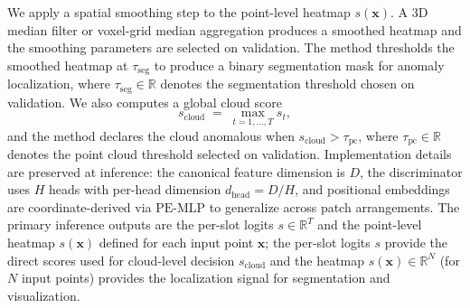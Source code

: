 We apply a spatial smoothing step to the point-level heatmap \(s(\mathbf{x})\). A 3D median filter or voxel-grid median aggregation produces a smoothed heatmap and the smoothing parameters are selected on validation. The method thresholds the smoothed heatmap at \(\tau_{\mathrm{seg}}\) to produce a binary segmentation mask for anomaly localization, where \(\tau_{\mathrm{seg}}\in\mathbb{R}\) denotes the segmentation threshold chosen on validation. We also computes a global cloud score
\begin{equation}
s_{\mathrm{cloud}} \;=\; \max_{t=1,\dots,T} s_t,
\end{equation}
and the method declares the cloud anomalous when \(s_{\mathrm{cloud}}>\tau_{\mathrm{pc}}\), where \(\tau_{\mathrm{pc}}\in\mathbb{R}\) denotes the point cloud threshold selected on validation. Implementation details are preserved at inference: the canonical feature dimension is \(D\), the discriminator uses \(H\) heads with per-head dimension \(d_{\mathrm{head}}=D/H\), and positional embeddings are coordinate-derived via \(\mathrm{PE\text{-}MLP}\) to generalize across patch arrangements. The primary inference outputs are the per-slot logits \(s\in\mathbb{R}^T\) and the point-level heatmap \(s(\mathbf{x})\) defined for each input point \(\mathbf{x}\); the per-slot logits \(s\) provide the direct scores used for cloud-level decision \(s_{\mathrm{cloud}}\) and the heatmap \(s(\mathbf{x})\in\mathbb{R}^N\) (for \(N\) input points) provides the localization signal for segmentation and visualization.
